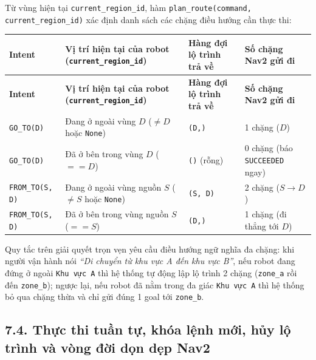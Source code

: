 Từ vùng hiện tại \texttt{current\_region\_id}, hàm \texttt{plan\_route(command, current\_region\_id)} xác định danh sách các chặng điều hướng cần thực thi:

\begin{longtable}{|p{}|p{}|p{}|p{}|}
\hline
\textbf{Intent} & \textbf{Vị trí hiện tại của robot (\texttt{current\_region\_id})} & \textbf{Hàng đợi lộ trình trả về} & \textbf{Số chặng Nav2 gửi đi} \\
\hline
\endfirsthead
\hline
\textbf{Intent} & \textbf{Vị trí hiện tại của robot (\texttt{current\_region\_id})} & \textbf{Hàng đợi lộ trình trả về} & \textbf{Số chặng Nav2 gửi đi} \\
\hline
\endhead
\texttt{GO\_TO(D)} & Đang ở ngoài vùng $D$ ($\neq D$ hoặc \texttt{None}) & \texttt{(D,)} & 1 chặng ($D$) \\
\hline
\texttt{GO\_TO(D)} & Đã ở bên trong vùng $D$ ($== D$) & \texttt{()} (rỗng) & 0 chặng (báo \texttt{SUCCEEDED} ngay) \\
\hline
\texttt{FROM\_TO(S, D)} & Đang ở ngoài vùng nguồn $S$ ($\neq S$ hoặc \texttt{None}) & \texttt{(S, D)} & 2 chặng ($S \rightarrow D$) \\
\hline
\texttt{FROM\_TO(S, D)} & Đã ở bên trong vùng nguồn $S$ ($== S$) & \texttt{(D,)} & 1 chặng (đi thẳng tới $D$) \\
\hline
\end{longtable}

Quy tắc trên giải quyết trọn vẹn yêu cầu điều hướng ngữ nghĩa đa chặng: khi người vận hành nói \textit{``Di chuyển từ khu vực A đến khu vực B''}, nếu robot đang đứng ở ngoài \texttt{Khu vực A} thì hệ thống tự động lập lộ trình 2 chặng (\texttt{zone\_a} rồi đến \texttt{zone\_b}); ngược lại, nếu robot đã nằm trong đa giác \texttt{Khu vực A} thì hệ thống bỏ qua chặng thừa và chỉ gửi đúng 1 goal tới \texttt{zone\_b}.

\subsection*{7.4. Thực thi tuần tự, khóa lệnh mới, hủy lộ trình và vòng đời dọn dẹp Nav2}

